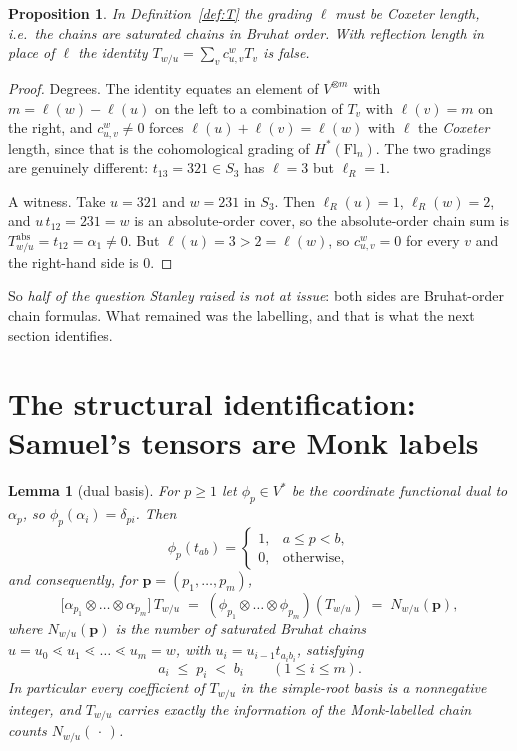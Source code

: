 \documentclass[11pt]{article}
\theoremstyle{plain}
\newtheorem{proposition}[theorem]{Proposition}
\newtheorem{lemma}[theorem]{Lemma}
\theoremstyle{definition}
\newcommand{\Fl}{\mathrm{Fl}}
\DeclareMathOperator{\len}{\ell}
\begin{document}
\begin{proposition}\label{prop:order}
In Definition~\ref{def:T} the grading $\len$ must be Coxeter length, i.e.\ the
chains are saturated chains in \emph{Bruhat} order. With reflection length in
place of $\len$ the identity $T_{w/u}=\sum_{v}c_{u,v}^{w}T_{v}$ is false.
\end{proposition}

\begin{proof}
Degrees. The identity equates an element of $V^{\otimes m}$ with
$m=\len(w)-\len(u)$ on the left to a combination of $T_{v}$ with
$\len(v)=m$ on the right, and $c_{u,v}^{w}\ne0$ forces
$\len(u)+\len(v)=\len(w)$ with $\len$ the \emph{Coxeter} length, since that is
the cohomological grading of $H^{*}(\Fl_{n})$. The two gradings are genuinely
different: $t_{13}=321\in S_{3}$ has $\len=3$ but $\len_{R}=1$.

A witness. Take $u=321$ and $w=231$ in $S_{3}$. Then $\len_{R}(u)=1$,
$\len_{R}(w)=2$, and $u\,t_{12}=231=w$ is an absolute-order cover, so the
absolute-order chain sum is $T^{\mathrm{abs}}_{w/u}=t_{12}=\alpha_{1}\ne0$.
But $\len(u)=3>2=\len(w)$, so $c_{u,v}^{w}=0$ for every $v$ and the right-hand
side is $0$.
\end{proof}

So \emph{half of the question Stanley raised is not at issue}: both sides are
Bruhat-order chain formulas. What remained was the labelling, and that is what
the next section identifies.

\section{The structural identification: Samuel's tensors are Monk labels}

\begin{lemma}[dual basis]\label{lem:dual}
For $p\ge1$ let $\phi_{p}\in V^{*}$ be the coordinate functional dual to
$\alpha_{p}$, so $\phi_{p}(\alpha_{i})=\delta_{pi}$. Then
\[
  \phi_{p}(t_{ab})=
  \begin{cases}
    1,& a\le p<b,\\
    0,&\text{otherwise,}
  \end{cases}
\]
and consequently, for $\mathbf{p}=(p_{1},\dots,p_{m})$,
\[
  \bigl[\alpha_{p_{1}}\otimes\dots\otimes\alpha_{p_{m}}\bigr]\,T_{w/u}
  \;=\;
  (\phi_{p_{1}}\otimes\dots\otimes\phi_{p_{m}})(T_{w/u})
  \;=\;
  N_{w/u}(\mathbf{p}),
\]
where $N_{w/u}(\mathbf{p})$ is the number of saturated Bruhat chains
$u=u_{0}\lessdot u_{1}\lessdot\dots\lessdot u_{m}=w$, with
$u_{i}=u_{i-1}t_{a_{i}b_{i}}$, satisfying
\[
  a_{i}\;\le\;p_{i}\;<\;b_{i}\qquad (1\le i\le m).
\tag{Monk labels}
\]
In particular every coefficient of $T_{w/u}$ in the simple-root basis is a
nonnegative integer, and $T_{w/u}$ carries exactly the information of the
Monk-labelled chain counts $N_{w/u}(\,\cdot\,)$.
\end{lemma}
\end{document}
